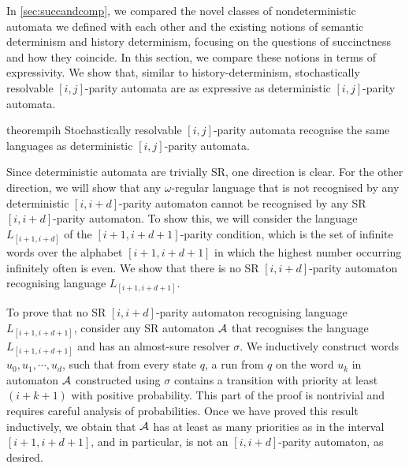 In \cref{sec:succandcomp}, we compared the novel classes of nondeterministic automata we defined with each other and the existing notions of semantic determinism and history determinism, focusing on the questions of succinctness and how they coincide. In this section, we compare these notions in terms of expressivity. We show that, similar to history-determinism, stochastically resolvable $[i,j]$-parity automata are as expressive as deterministic $[i,j]$-parity  automata.

\begin{restatable}{theorem}{pih}\label{theorem:pih}
Stochastically resolvable $[i,j]$-parity automata recognise the same  languages as deterministic $[i,j]$-parity automata.
\end{restatable}
Since deterministic automata are trivially SR, one direction is clear. For the other direction, we will show that any $\omega$-regular language that is not recognised by any deterministic $[i,i+d]$-parity automaton  cannot be recognised by any SR $[i,i+d]$-parity automaton. To show this, we will consider the language $L_{[i+1,i+d]}$ of the $[i+1,i+d+1]$-parity condition, which is the set of infinite words over the alphabet $[i+1,i+d+1]$ in which the highest number occurring infinitely often is even. We show that there is no SR $[i,i+d]$-parity automaton recognising language $L_{[i+1,i+d+1]}$. 

To prove that no SR $[i,i+d]$-parity automaton recognising language $L_{[i+1,i+d+1]}$, consider any SR automaton $\mathcal{A}$ that recognises the language $L_{[i+1,i+d+1]}$ and has an almost-sure resolver $\sigma$. We inductively construct words $u_0,u_1,\cdots,u_d$, such that from every state $q$, a run from $q$ on the word $u_k$ in automaton $\mathcal{A}$ constructed using $\sigma$ contains a transition with priority at least $(i+k+1)$ with positive probability. This part of the proof is nontrivial and requires careful analysis of probabilities. Once we have proved this result inductively, we obtain that $\mathcal{A}$ has at least as many priorities as in the interval $[i+1,i+d+1]$, and in particular, is not an $[i,i+d]$-parity automaton, as desired.
